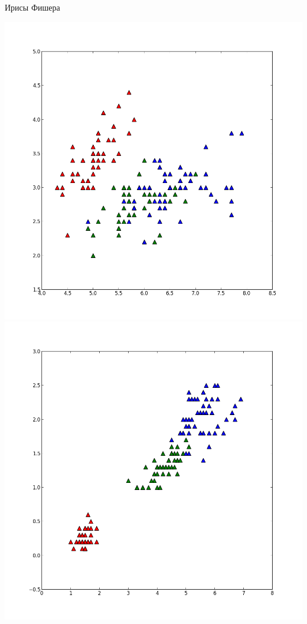 \documentclass[10pt,a4paper]{beamer}
\begin{document}
\begin{frame}{Ирисы Фишера}
\begin{center}
\includegraphics[scale=0.2]{images/iris01.png} \;
\includegraphics[scale=0.2]{images/iris23.png}
\end{center}

\end{frame}
\end{document}
